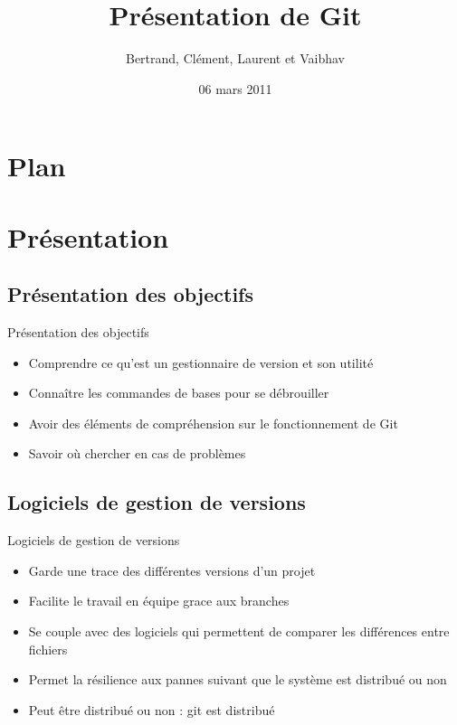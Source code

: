\documentclass{beamer}
\title[ROSE]{Présentation de Git}
\author{Bertrand, Clément, Laurent et Vaibhav}
\institute{Télécom Paristech}
\date{06 mars 2011}
\begin{document}
\begin{frame}
\titlepage
\end{frame}

\section*{Plan}

\section{Présentation}
\subsection*{Présentation des objectifs}
\begin{frame}{Présentation des objectifs}
  \begin{itemize}
  \item Comprendre ce qu'est un gestionnaire de version et son utilité
  \item Connaître les commandes de bases pour se débrouiller
  \item Avoir des éléments de compréhension sur le fonctionnement de Git
  \item Savoir où chercher en cas de problèmes
  \end{itemize}
\end{frame}

\subsection*{Logiciels de gestion de versions}
\begin{frame}{Logiciels de gestion de versions}
  \begin{itemize}
  \item Garde une trace des différentes versions d'un projet 
  \item Facilite le travail en équipe grace aux branches 
  \item Se couple avec des logiciels qui permettent de comparer les différences entre fichiers 
  \item Permet la résilience aux pannes suivant que le système est distribué ou non
  \item Peut être distribué ou non : git est distribué 
  \end{itemize}
\end{frame}
\end{document}
